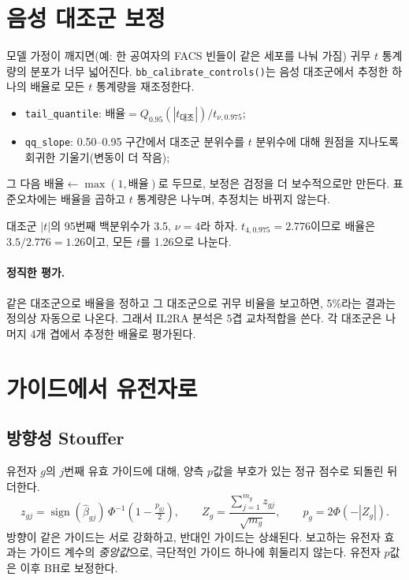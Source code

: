 \documentclass[11pt]{article}
\begin{document}
\section{음성 대조군 보정}

모델 가정이 깨지면(예: 한 공여자의 FACS 빈들이 같은 세포를 나눠 가짐) 귀무
$t$ 통계량의 분포가 너무 넓어진다. \texttt{bb\_calibrate\_controls()}는 음성
대조군에서 추정한 하나의 배율로 모든 $t$ 통계량을 재조정한다.
\begin{itemize}[itemsep=1pt]
\item \texttt{tail\_quantile}: $\text{배율}=Q_{0.95}(|t_{\text{대조}}|)/t_{\nu,0.975}$;
\item \texttt{qq\_slope}: 0.50--0.95 구간에서 대조군 분위수를 $t$ 분위수에 대해
원점을 지나도록 회귀한 기울기(변동이 더 작음);
\end{itemize}
그 다음 $\text{배율}\leftarrow\max(1,\text{배율})$로 두므로, 보정은 검정을 더
보수적으로만 만든다. 표준오차에는 배율을 곱하고 $t$ 통계량은 나누며, 추정치는
바뀌지 않는다.

\begin{example}[: 꼬리 배율]
대조군 $|t|$의 95번째 백분위수가 3.5, $\nu=4$라 하자. $t_{4,0.975}=2.776$이므로
배율은 $3.5/2.776=1.26$이고, 모든 $t$를 1.26으로 나눈다.
\end{example}

\paragraph{정직한 평가.} 같은 대조군으로 배율을 정하고 그 대조군으로 귀무 비율을
보고하면, 5\%라는 결과는 정의상 자동으로 나온다. 그래서 IL2RA 분석은 5겹
교차적합을 쓴다. 각 대조군은 나머지 4개 겹에서 추정한 배율로 평가된다.

\section{가이드에서 유전자로}

\subsection{방향성 Stouffer}

유전자 $g$의 $j$번째 유효 가이드에 대해, 양측 $p$값을 부호가 있는 정규 점수로
되돌린 뒤 더한다.
\begin{equation}
z_{gj}=\operatorname{sign}(\hat\beta_{gj})\,\Phi^{-1}\!\left(1-\tfrac{p_{gj}}{2}\right),
\qquad
Z_g=\frac{\sum_{j=1}^{m_g}z_{gj}}{\sqrt{m_g}},\qquad p_g=2\Phi(-|Z_g|).
\end{equation}
방향이 같은 가이드는 서로 강화하고, 반대인 가이드는 상쇄된다. 보고하는 유전자
효과는 가이드 계수의 \emph{중앙값}으로, 극단적인 가이드 하나에 휘둘리지 않는다.
유전자 $p$값은 이후 BH로 보정한다.
\end{document}
